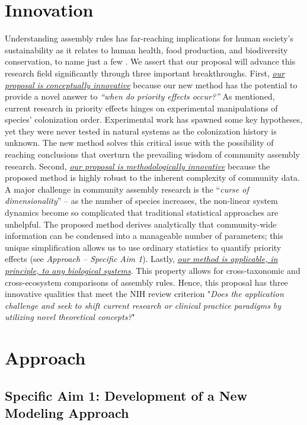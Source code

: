 \documentclass[12pt, class=article, crop=false]{standalone}
\begin{document}
\section{Innovation}
Understanding assembly rules has far-reaching implications for human society's sustainability as it relates to human health, food production, and biodiversity conservation, to name just a few \citep{fukami_historical_2015}.
We assert that our proposal will advance this research field significantly through three important breakthroughs.
First, \ul{\emph{our proposal is conceptually innovative}} because our new method has the potential to provide a novel answer to \textit{``when do priority effects occur?''}
As mentioned, current research in priority effects hinges on experimental manipulations of species' colonization order.
Experimental work has spawned some key hypotheses, yet they were never tested in natural systems as the colonization history is unknown. 
The new method solves this critical issue with the possibility of reaching conclusions that overturn the prevailing wisdom of community assembly research.
Second, \ul{\emph{our proposal is methodologically innovative}} because the proposed method is highly robust to the inherent complexity of community data.
A major challenge in community assembly research is the ``\textit{curse of dimensionality}'' -- as the number of species increases, the non-linear system dynamics become so complicated that traditional statistical approaches are unhelpful.
The proposed method derives analytically that community-wide information can be condensed into a manageable number of parameters; this unique simplification allows us to use ordinary statistics to quantify priority effects (see \textit{Approach -- Specific Aim 1}).
Lastly, \ul{\emph{our method is applicable, in principle, to any biological systems}}.
This property allows for cross-taxonomic and cross-ecosystem comparisons of assembly rules.
Hence, this proposal has three innovative qualities that meet the NIH review criterion "\emph{Does the application challenge and seek to shift current research or clinical practice paradigms by utilizing novel theoretical concepts?}"

\section{Approach}

\subsection*{Specific Aim 1: Development of a New Modeling Approach}
\end{document}
